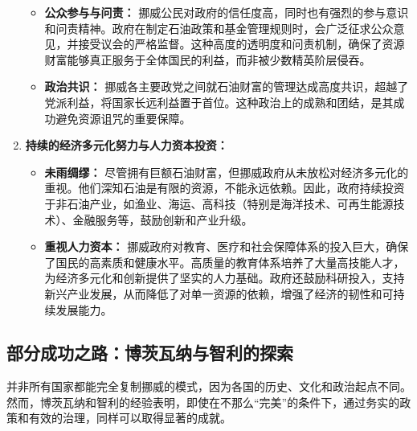 \begin{enumerate}
\begin{itemize}
        \item \textbf{公众参与与问责：} 挪威公民对政府的信任度高，同时也有强烈的参与意识和问责精神。政府在制定石油政策和基金管理规则时，会广泛征求公众意见，并接受议会的严格监督。这种高度的透明度和问责机制，确保了资源财富能够真正服务于全体国民的利益，而非被少数精英阶层侵吞。
        \item \textbf{政治共识：} 挪威各主要政党之间就石油财富的管理达成高度共识，超越了党派利益，将国家长远利益置于首位。这种政治上的成熟和团结，是其成功避免资源诅咒的重要保障。
    \end{itemize}
    \item \textbf{持续的经济多元化努力与人力资本投资：}
    \begin{itemize}
        \item \textbf{未雨绸缪：} 尽管拥有巨额石油财富，但挪威政府从未放松对经济多元化的重视。他们深知石油是有限的资源，不能永远依赖。因此，政府持续投资于非石油产业，如渔业、海运、高科技（特别是海洋技术、可再生能源技术）、金融服务等，鼓励创新和产业升级。
        \item \textbf{重视人力资本：} 挪威政府对教育、医疗和社会保障体系的投入巨大，确保了国民的高素质和健康水平。高质量的教育体系培养了大量高技能人才，为经济多元化和创新提供了坚实的人力基础。政府还鼓励科研投入，支持新兴产业发展，从而降低了对单一资源的依赖，增强了经济的韧性和可持续发展能力。
    \end{itemize}
\end{enumerate}

\subsection{部分成功之路：博茨瓦纳与智利的探索}

并非所有国家都能完全复制挪威的模式，因为各国的历史、文化和政治起点不同。然而，博茨瓦纳和智利的经验表明，即使在不那么“完美”的条件下，通过务实的政策和有效的治理，同样可以取得显著的成就。

